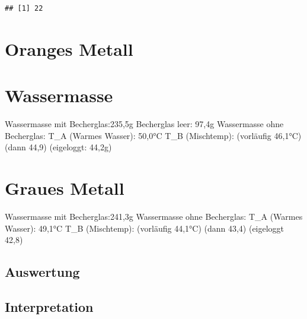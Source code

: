\documentclass[
  9pt,
]{article}
\begin{document}
\begin{verbatim}
## [1] 22
\end{verbatim}

\hypertarget{oranges-metall}{%
\section{Oranges Metall}\label{oranges-metall}}

\hypertarget{wassermasse}{%
\section{Wassermasse}\label{wassermasse}}

Wassermasse mit Becherglas:235,5g Becherglas leer: 97,4g Wassermasse
ohne Becherglas: T\_A (Warmes Wasser): 50,0°C T\_B (Mischtemp):
(vorläufig 46,1°C) (dann 44,9) (eigeloggt: 44,2g)

\hypertarget{graues-metall}{%
\section{Graues Metall}\label{graues-metall}}

Wassermasse mit Becherglas:241,3g Wassermasse ohne Becherglas: T\_A
(Warmes Wasser): 49,1°C T\_B (Mischtemp): (vorläufig 44,1°C) (dann 43,4)
(eigeloggt 42,8)

\hypertarget{auswertung-1}{%
\subsection{Auswertung}\label{auswertung-1}}

\hypertarget{interpretation-1}{%
\subsection{Interpretation}\label{interpretation-1}}
\end{document}

